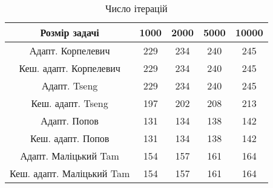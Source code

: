 \begin{table}[H]
	\centering
	\begin{tabular}{|c||c|c|c|c|}\hline
		Розмір задачі & 1000 & 2000 & 5000 & 10000 \\ \hline \hline
		Адапт. Корпелевич & 229 & 234 & 240 & 245 \\ \hline
		Кеш. адапт. Корпелевич & 229 & 234 & 240 & 245 \\ \hline
		Адапт. Tseng & 229 & 234 & 240 & 245 \\ \hline
		Кеш. адапт. Tseng & 197 & 202 & 208 & 213 \\ \hline
		Адапт. Попов & 131 & 134 & 138 & 142 \\ \hline
		Кеш. адапт. Попов & 131 & 134 & 138 & 142 \\ \hline
		Адапт. Маліцький Tam & 154 & 157 & 161 & 164 \\ \hline
		Кеш. адапт. Маліцький Tam & 154 & 157 & 161 & 164 \\ \hline
	\end{tabular}
	\caption{Число ітерацій}
\end{table}
